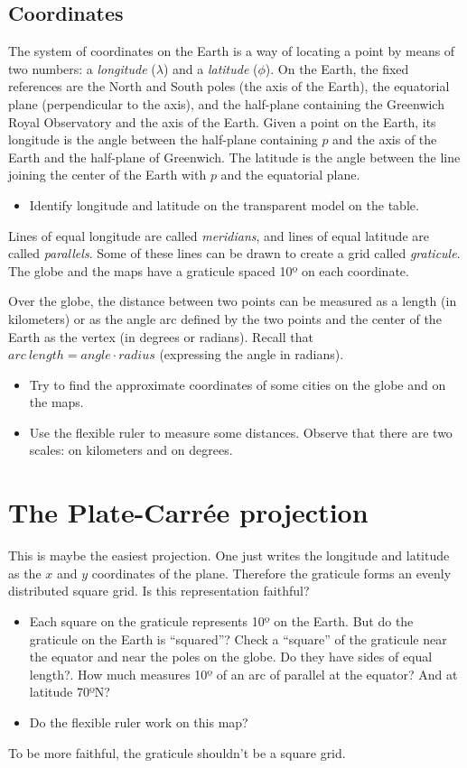 \documentclass[a4paper,12pt]{article}
\begin{document}
\subsection*{Coordinates}
The system of coordinates on the Earth is a way of locating a point by means of two numbers: a \emph{longitude} ($\lambda$) and a \emph{latitude} ($\phi$). On the Earth, the fixed references are the North and South poles (the axis of the Earth), the equatorial plane (perpendicular to the axis), and the half-plane containing the Greenwich Royal Observatory and the axis of the Earth. Given a point on the Earth, its longitude is the angle between the half-plane containing $p$ and the axis of the Earth and the half-plane of Greenwich. The latitude is the angle between the line joining the center of the Earth with $p$ and the equatorial plane.
\begin{itemize}
 \item Identify longitude and latitude on the transparent model on the table.
\end{itemize}
Lines of equal longitude are called \emph{meridians}, and lines of equal latitude are called \emph{parallels}. Some of these lines can be drawn to create a grid called \emph{graticule}. The globe and the maps have a graticule spaced 10º on each coordinate.

Over the globe, the distance between two points can be measured as a length (in kilometers) or as the angle arc defined by the two points and the center of the Earth as the vertex (in degrees or radians). Recall that $arc\ length = angle  \cdot  radius$ (expressing the angle in radians).
\begin{itemize}
 \item Try to find the approximate coordinates of some cities on the globe and on the maps.
 \item Use the flexible ruler to measure some distances. Observe that there are two scales: on kilometers and on degrees.
\end{itemize}





\newpage
\section{The Plate-Carrée projection}
This is maybe the easiest projection. One just writes the longitude and latitude as the $x$ and $y$ coordinates of the plane. Therefore the
graticule forms an evenly distributed square grid. Is this representation faithful?
\begin{itemize}
 \item Each square on the graticule represents 10º on the Earth. But do the graticule on the Earth is ``squared''? Check a ``square'' of the graticule near the equator and near the poles on the globe. Do they have sides of equal length?. How much measures 10º of an arc of parallel at the equator? And at latitude 70ºN?
 \item Do the flexible ruler work on this map? 
\end{itemize}
To be more faithful, the graticule shouldn't be a square grid.
\end{document}
